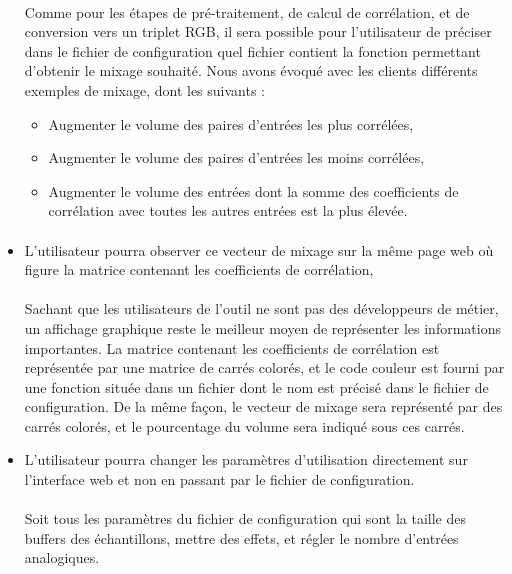 \documentclass{article}
\begin{document}
\begin{itemize}
       \paragraph{}
       Comme pour les étapes de pré-traitement, de calcul de corrélation, et de
       conversion vers un triplet RGB, il sera possible pour l'utilisateur de
       préciser dans le fichier de configuration quel fichier contient la
       fonction permettant d'obtenir le mixage souhaité. Nous avons évoqué avec
       les clients différents exemples de mixage, dont les suivants :
       \begin{itemize}
        \item Augmenter le volume des paires d'entrées les plus corrélées,
        \item Augmenter le volume des paires d'entrées les moins corrélées,
        \item Augmenter le volume des entrées dont la somme des coefficients de
              corrélation avec toutes les autres entrées est la plus élevée.
       \end{itemize}
       \paragraph{}
       
 \item L'utilisateur pourra observer ce vecteur de mixage sur la même page
       web où figure la matrice contenant les coefficients de corrélation,
       \paragraph{}
       Sachant que les utilisateurs de l'outil ne sont pas des développeurs de
       métier, un affichage graphique reste le meilleur moyen de représenter les
       informations importantes. La matrice contenant les coefficients de
       corrélation est représentée par une matrice de carrés colorés, et le
       code couleur est fourni par une fonction située dans un fichier dont le
       nom est précisé dans le fichier de configuration. De la même façon, le
       vecteur de mixage sera représenté par des carrés colorés, et le
       pourcentage du volume sera indiqué sous ces carrés.\\
       
 \item L'utilisateur pourra changer les paramètres d'utilisation directement sur
       l'interface web et non en passant par le fichier de configuration.
       \paragraph{}
       Soit tous les paramètres du fichier de configuration qui sont la taille des buffers
       des échantillons, mettre des effets, et régler le nombre d'entrées analogiques.
       

\end{itemize}
\end{document}
